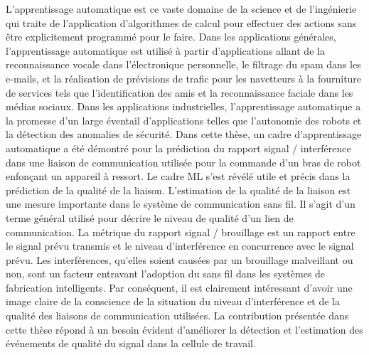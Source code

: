 \documentclass[12pt]{article}
\begin{document}
L'apprentissage automatique est ce vaste domaine de la science et de l'ingénierie qui traite de l'application d'algorithmes de calcul pour effectuer des actions sans être explicitement programmé pour le faire. Dans les applications générales, l'apprentissage automatique est utilisé à partir d'applications allant de la reconnaissance vocale dans l'électronique personnelle, le filtrage du spam dans les e-mails, et la réalisation de prévisions de trafic pour les navetteurs à la fourniture de services tels que l'identification des amis et la reconnaissance faciale dans les médias sociaux. Dans les applications industrielles, l'apprentissage automatique a la promesse d'un large éventail d'applications telles que l'autonomie des robots et la détection des anomalies de sécurité. Dans cette thèse, un cadre d'apprentissage automatique a été démontré pour la prédiction du rapport signal / interférence dans une liaison de communication utilisée pour la commande d'un bras de robot enfonçant un appareil à ressort. Le cadre ML s'est révélé utile et précis dans la prédiction de la qualité de la liaison. L'estimation de la qualité de la liaison est une mesure importante dans le système de communication sans fil. Il s'agit d'un terme général utilisé pour décrire le niveau de qualité d'un lien de communication. La métrique du rapport signal / brouillage est un rapport entre le signal prévu transmis et le niveau d'interférence en concurrence avec le signal prévu. Les interférences, qu'elles soient causées par un brouillage malveillant ou non, sont un facteur entravant l'adoption du sans fil dans les systèmes de fabrication intelligents. Par conséquent, il est clairement intéressant d'avoir une image claire de la conscience de la situation du niveau d'interférence et de la qualité des liaisons de communication utilisées. La contribution présentée dans cette thèse répond à un besoin évident d'améliorer la détection et l'estimation des événements de qualité du signal dans la cellule de travail.  
\end{document}
